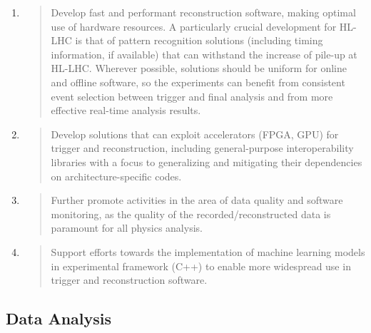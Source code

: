 \documentclass[11pt,a4paper]{article}
\begin{document}
\begin{enumerate}
\def\labelenumi{\arabic{enumi}.}
\item
  \begin{quote}
  Develop fast and performant reconstruction software, making optimal
  use of hardware resources. A particularly crucial development for
  HL-LHC is that of pattern recognition solutions (including timing
  information, if available) that can withstand the increase of pile-up
  at HL-LHC. Wherever possible, solutions should be uniform for online
  and offline software, so the experiments can benefit from consistent
  event selection between trigger and final analysis and from more
  effective real-time analysis results.
  \end{quote}
\item
  \begin{quote}
  Develop solutions that can exploit accelerators (FPGA, GPU) for
  trigger and reconstruction, including general-purpose interoperability
  libraries with a focus to generalizing and mitigating their
  dependencies on architecture-specific codes.
  \end{quote}
\item
  \begin{quote}
  Further promote activities in the area of data quality and software
  monitoring, as the quality of the recorded/reconstructed data is
  paramount for all physics analysis.
  \end{quote}
\item
  \begin{quote}
  Support efforts towards the implementation of machine learning models
  in experimental framework (C++) to enable more widespread use in
  trigger and reconstruction software.
  \end{quote}
\end{enumerate}

\hypertarget{data-analysis-1}{%
\subsection{Data Analysis}\label{data-analysis-1}}
\end{document}

